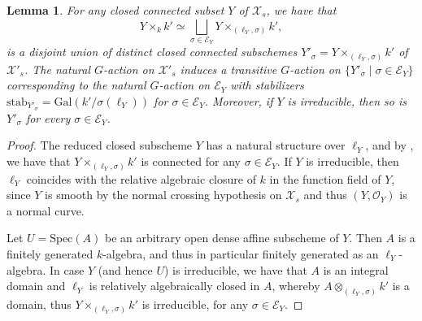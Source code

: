 \documentclass[a4paper,12pt,reqno]{amsart}
\newcommand\mc\mathcal
\newtheorem{lem}[thm]{Lemma}
\theoremstyle{definition}
\numberwithin{equation}{thm}
\begin{document}
\begin{lem}\label{decomposition base change} For any closed connected subset $Y$ of $\mc{X}_s$,  we have that  $$Y \times_k k' \simeq \bigsqcup_{\sigma \in \mc{E}_Y} Y \times_{(\ell_Y, \sigma)} k',$$
is a disjoint union of distinct closed connected subschemes $Y'_\sigma = Y \times_{(\ell_Y, \sigma)} k'$ of $\mc{X}'_s$. The natural $G$-action on $\mc{X}'_s$ induces a transitive $G$-action on $\{ Y'_\sigma \mid  \sigma \in \mc{E}_Y \}$ corresponding to the natural $G$-action on $\mc{E}_Y$ with stabilizers $\mathrm{stab}_{Y'_\sigma} = \mathrm{Gal}(k'/\sigma(\ell_Y))$ for $\sigma \in \mc{E}_Y$.
Moreover, if $Y$ is irreducible, then so is $Y'_\sigma$ for every $\sigma \in \mc{E}_Y$. 
\end{lem}
\begin{proof}
The reduced closed subscheme $Y$ has a natural structure over $\ell_Y$, and by  \cite[\href{https://stacks.math.columbia.edu/tag/0FD1}{Lemma 0FD1}]{stacks-project}, we  have that $Y\times_{(\ell_Y,\sigma)} k'$ is connected for any $\sigma \in \mathcal{E}_Y$. If $Y$ is irreducible, then 
$\ell_Y$ coincides with the relative algebraic closure of $k$ in the function field of $Y$, since $Y$ is smooth by the normal crossing hypothesis on $\mc{X}_s$ and thus $(Y, \mathcal{O}_Y)$ is a normal curve.

Let $U=\mathrm{Spec}(A)$ be an arbitrary open dense affine subscheme of $Y$. Then $A$ is a finitely generated $k$-algebra, and thus in particular finitely generated as an $\ell_Y$-algebra.  In case $Y$ (and hence $U$) is irreducible, we have that $A$ is an integral domain and $\ell_Y$ is relatively algebraically closed in $A$, whereby $A \otimes_{(\ell_Y,\sigma)} k'$ is a domain, thus $Y \times_{(\ell_Y,\sigma)} k' $ is irreducible, for any $\sigma \in \mathcal{E}_Y$.


\end{proof}
\end{document}
